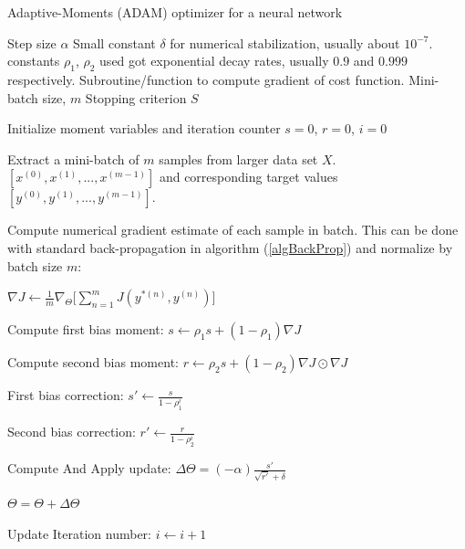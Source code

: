 \documentclass[12pt,letterpaper]{article}
\begin{document}
\begin{algorithm}[H]
\caption{Adaptive-Moments (ADAM) optimizer for a neural network}
\label{algAdaGrad}

\begin{algorithmic}
\REQUIRE Step size $\alpha$
\REQUIRE Small constant $\delta$ for numerical stabilization, usually about $10^{-7}$.
\REQUIRE constants $\rho_1$, $\rho_2$ used got exponential decay rates, usually $0.9$ and $0.999$ respectively.
\REQUIRE Subroutine/function to compute gradient of cost function.
\REQUIRE Mini-batch size, $m$
\REQUIRE Stopping criterion $S$

Initialize moment variables and iteration counter $s = 0$, $r = 0$, $i = 0$ \\

	\item Extract a mini-batch of $m$ samples from larger data set $X$. $[x^{(0)},x^{(1)},...,x^{(m-1)}]$ and corresponding target values 
	$[y^{(0)},y^{(1)},...,y^{(m-1)}]$.
	\item Compute numerical gradient estimate of each sample in batch. This can be done with standard back-propagation in algorithm (\ref{algBackProp}) and 			 	normalize by batch size $m$:
	\item $\nabla J \leftarrow \frac{1}{m} \nabla_{\Theta} \Big[\sum_{n=1}^{m} J(y^{*(n)},y^{(n)}) \Big]$
	
	\item Compute first bias moment: $s \leftarrow \rho_1 s + (1 - \rho_1) \nabla J$
	\item Compute second bias moment: $r \leftarrow \rho_2 s + (1 - \rho_2) \nabla J \odot \nabla J$
	\item First bias correction: $s' \leftarrow \frac{s}{1 - \rho_1^i}$
	\item Second bias correction: $r' \leftarrow \frac{r}{1 - \rho_2^i}$
	
	\item Compute And Apply update:	$\Delta \Theta = (-\alpha) \frac{s'}{\sqrt{r'} + \delta}$
	\item $\Theta = \Theta + \Delta \Theta$	
	\item Update Iteration number: $i \leftarrow i + 1$
\ENDWHILE

\end{algorithmic}
\end{algorithm}


\end{document}
